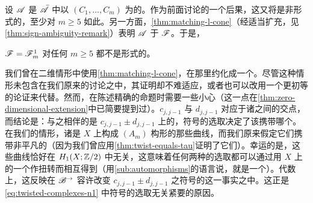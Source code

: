 设 $\mathscr{A}$ 是 $\bar{\mathscr{A}}$ 中以 $(C_1,\ldots,C_m)$ 为\trObject{}的\trFullSubcategory。作为前面讨论的一个后果，这又将是非形式的，至少对 $m\ge 5$ 如此。另一方面，\cref{thm:matching-l-cone}（经适当扩充，见\cref{thm:sign-ambiguity-remark}）表明 $\mathscr{A}$ \trQuasiisomorphic{}于 $\mathscr{F}$。于是，
\begin{corollary}\label{thm:f1-not-formal}
$\mathscr{F}=\mathscr{F}^1_m$ 对任何 $m\ge 5$ 都不是形式的。
\noqed
\end{corollary}
\begin{remark}\label{thm:sign-ambiguity-remark}
我们曾在二维情形中使用\cref{thm:matching-l-cone}，在那里\trLefschetzFibration{}约化成一个\trDoubleBranchedCover。尽管这种情形未包含在我们原来的讨论之中，其证明却不难适应，或者也可以改用一个更初等的论证来代替。然而，在陈述精确的命题时需要一些小心（这一点在\cref{thm:zero-dimensional-extension}中已简要提到过）。\trMorphism{}$c_{j,j-1}$ 与 $d_{j,j-1}$ 对应于诸\trLefschetzThimble{}之间的交点，而结论是：与之相伴的\trMatchingCycle{}是 $c_{j,j-1}\pm d_{j,j-1}$ 上的\trCone，符号的选取决定了该\trMatchingCycle{}携带哪个\trPinStructure。在我们的情形，诸\trMatchingCycle{}是 $X$ 上构成 $(A_m)$ 构形的那些曲线，而我们原来假定它们携带非平凡的\trPinStructure（因为我们曾应用\cref{thm:twist-equals-tau}证明了它们\trSplitGeneration）。幸运的是，这些曲线恰好在 $H_1(X;\mathbb{Z}/2)$ 中\trLinear{}无关，这意味着任何两种\trPinStructure{}的选取都可以通过用 $X$ 上的一个\trRealLineBundle{}作扭转而相互得到（用\cref{sub:automorphisms}的语言说，就是一个\trBrane\trAutomorphism）。代数上，这反映在 $\mathscr{B}^{\rightarrow}$ 容许改变 $c_{j,j-1}\pm d_{j,j-1}$ 之符号的\trAutomorphism{}这一事实之中。这正是 \eqref{eq:twisted-complexes-n1} 中符号的选取无关紧要的原因。
\end{remark}
